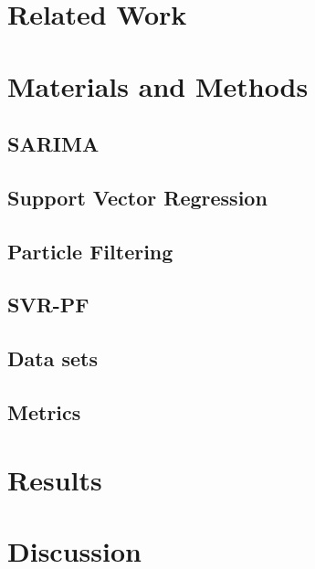 \documentclass[runningheads]{llncs}
\begin{document}
\section{Related Work}
\label{sec:related_work}


\section{Materials and Methods}
\label{sec:material_methods}

\subsection{SARIMA}



\subsection{Support Vector Regression}



\subsection{Particle Filtering}



\subsection{SVR-PF}



\subsection{Data sets}


\subsection{Metrics}





\section{Results}
\label{sec:results}



\section{Discussion}
\label{sec:discussion}

\end{document}
